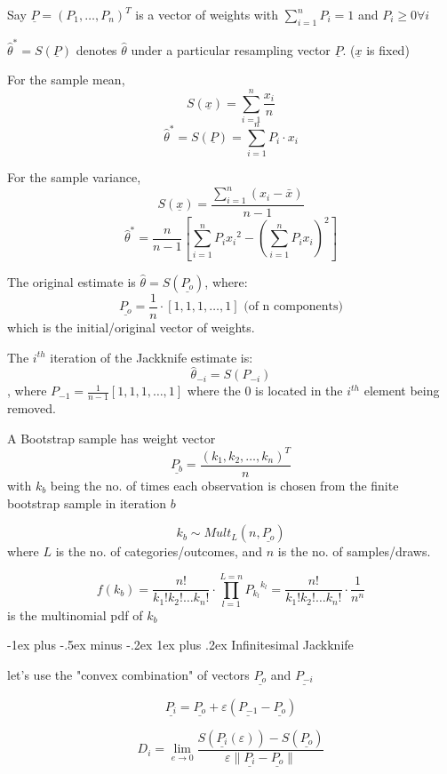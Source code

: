 \documentclass[10pt,landscape]{article}
\makeatletter
\renewcommand{\subsubsection}{\@startsection{subsubsection}{3}{0mm}%
                                {-1ex plus -.5ex minus -.2ex}%
                                {1ex plus .2ex}%
                                {\normalfont\small\bfseries}}
\makeatother
\begin{document}
\begin{multicols}{3}
Say $\underline{P} = (P_1, \hdots, P_n)^T$ is a vector of weights with $\sum_{i = 1}^{n} P_i = 1$ and $P_i \geq 0 \forall i$

\medskip
$\hat{\theta}^* = S(\underline{P})$ denotes $\hat{\theta}$ under a particular resampling vector $\underline{P}$. ($\underline{x}$ is fixed)

\medskip
For the sample mean,
$$ S(\underline{x}) = \sum_{i = 1}^{n} \frac{x_i}{n} $$
$$ \hat{\theta}^* = S(\underline{P}) = \sum_{i = 1}^{n} P_i \cdot x_i $$

\medskip
For the sample variance,
$$ S(\underline{x}) = \frac{\sum_{i = 1}^{n} (x_i - \bar{x})}{n - 1} $$
$$ \hat{\theta}^* = \frac{n}{n - 1} \left[\sum_{i = 1}^n P_i {x_i}^2 - \left( \sum_{i = 1}^n P_i x_i \right)^2\right] $$

\medskip
The original estimate is $\hat{\theta} = S(\underline{P_o})$, where: $$ \underline{P_o} = \frac{1}{n} \cdot [1, 1, 1, \hdots, 1] \text{ (of n components)}$$ which is the initial/original vector of weights.

\medskip
The $i^{th}$ iteration of the Jackknife estimate is: $$ \hat{\theta}_{-i} = S(P_{-i}) $$, where $P_{-1} = \frac{1}{n - 1} [1, 1, 1, \hdots, 1]$ where the $0$ is located in the $i^{th}$ element being removed.

\medskip
A Bootstrap sample has weight vector $$ \underline{P_b} = \frac{(k_1, k_2, \hdots, k_n)^T}{n} $$ with $k_b$ being the no. of times each observation is chosen from the finite bootstrap sample in iteration $b$

$$ k_b \sim Mult_L(n, \underline{P_o}) $$ where $L$ is the no. of categories/outcomes, and $n$ is the no. of samples/draws.

$$ f (k_b) = \frac{n!}{k_1! k_2! \hdots k_n!} \cdot \prod_{l = 1}^{L = n} {P_{k_l}}^{k_l} = \frac{n!}{k_1! k_2! \hdots k_n!} \cdot \frac{1}{n^n} $$ is the multinomial pdf of $k_b$

\subsubsection{Infinitesimal Jackknife}

let's use the "convex combination" of vectors $\underline{P_o}$ and $\underline{P_{-i}}$

$$ \underline{P_i} = \underline{P_o} + \varepsilon (\underline{P_{-1}} - \underline{P_o}) $$

$$ D_i = \lim_{e \rightarrow 0} \frac{S(\underline{P_i} (\varepsilon)) - S(\underline{P_o})}{\varepsilon \parallel \underline{P_i} - \underline{P_o} \parallel} $$


\end{multicols}
\end{document}
